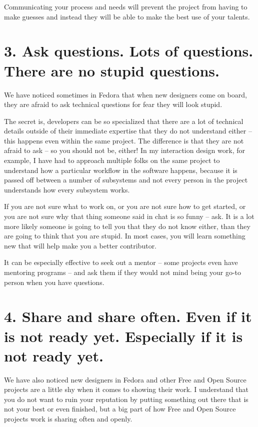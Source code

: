 Communicating your process and needs will prevent the project from having to
make guesses and instead they will be able to make the best use of your talents.

\section*{3. Ask questions. Lots of questions. There are no stupid questions.}

We have noticed sometimes in Fedora that when new designers come on board, they
are afraid to ask technical questions for fear they will look stupid. 

The secret is, developers can be so specialized that there are a lot of
technical details outside of their immediate expertise that they do not
understand either -- this happens even within the same project. The difference is that they are not afraid to ask -- so you should not be, either! In my interaction design work, for example, I have had to approach multiple folks on the same project to understand how a particular workflow in the software happens, because it is passed off between a number of subsystems and not every person in the project understands how every subsystem works. 

If you are not sure what to work on, or you are not sure how to get started, or
you are not sure why that thing someone said in chat is so funny -- ask. It is a
lot more likely someone is going to tell you that they do not know either, than
they are going to think that you are stupid. In most cases, you will learn
something new that will help make you a better contributor.

It can be especially effective to seek out a mentor -- some projects even have
mentoring programs -- and ask them if they would not mind being your go-to person when you have questions. 

\section*{4. Share and share often. Even if it is not ready yet. Especially if it
is not ready yet.}

We have also noticed new designers in Fedora and other Free and Open Source projects
are a little shy when it comes to showing their work. I understand that you
do not want to ruin your reputation by putting something out there that is not
your best or even finished, but a big part of how Free and Open Source projects
work is sharing often and openly. 

